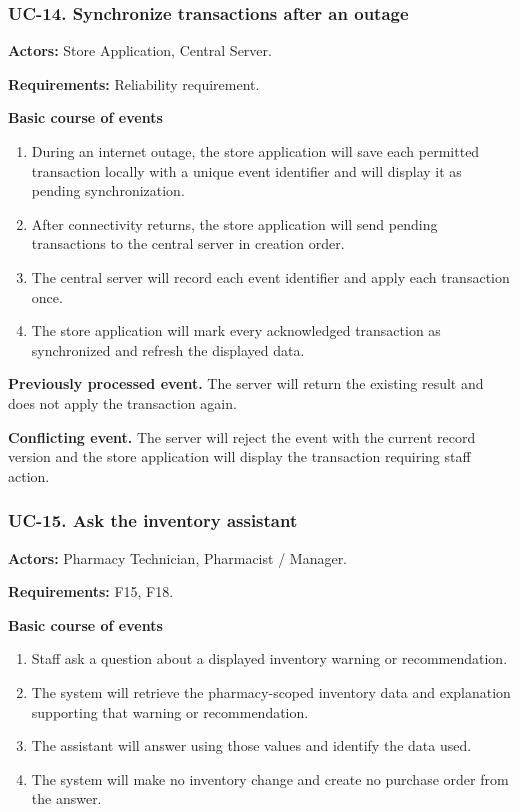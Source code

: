 \clearpage
\subsubsection*{UC-14. Synchronize transactions after an outage}
\textbf{Actors:} Store Application, Central Server.

\textbf{Requirements:} Reliability requirement.

\textbf{Basic course of events}
\begin{enumerate}
\item During an internet outage, the store application will save each permitted transaction locally with a unique event identifier and will display it as pending synchronization.
\item After connectivity returns, the store application will send pending transactions to the central server in creation order.
\item The central server will record each event identifier and apply each transaction once.
\item The store application will mark every acknowledged transaction as synchronized and refresh the displayed data.
\end{enumerate}

\textbf{Previously processed event.} The server will return the existing result and does not apply the transaction again.

\textbf{Conflicting event.} The server will reject the event with the current record version and the store application will display the transaction requiring staff action.


\clearpage
\subsubsection*{UC-15. Ask the inventory assistant}
\textbf{Actors:} Pharmacy Technician, Pharmacist / Manager.

\textbf{Requirements:} F15, F18.

\textbf{Basic course of events}
\begin{enumerate}
\item Staff ask a question about a displayed inventory warning or recommendation.
\item The system will retrieve the pharmacy-scoped inventory data and explanation supporting that warning or recommendation.
\item The assistant will answer using those values and identify the data used.
\item The system will make no inventory change and create no purchase order from the answer.
\end{enumerate}

